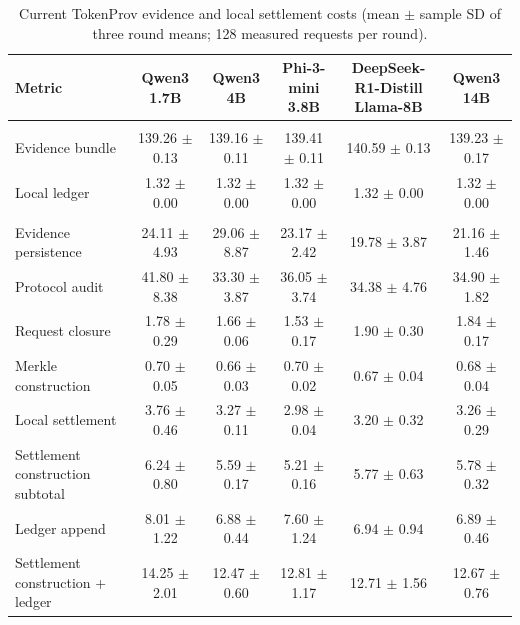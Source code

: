 \begin{table}[!t]
\centering
\caption{Current TokenProv evidence and local settlement costs (mean $\pm$ sample SD of three round means; 128 measured requests per round).}
\label{tab:d-current-evidence-settlement}
\footnotesize
\renewcommand{\arraystretch}{1.10}
\begin{tabular*}{\textwidth}{@{\hspace{4pt}}l@{\extracolsep{\fill}}ccccc@{\hspace{4pt}}}
\toprule
\textbf{Metric} & \shortstack{\textbf{Qwen3}\\\textbf{1.7B}} & \shortstack{\textbf{Qwen3}\\\textbf{4B}} & \shortstack{\textbf{Phi-3-mini}\\\textbf{3.8B}} & \shortstack{\textbf{DeepSeek-R1-Distill}\\\textbf{Llama-8B}} & \shortstack{\textbf{Qwen3}\\\textbf{14B}} \\
\midrule
\rowcolor{gray!12}
\multicolumn{6}{l}{\textbf{Serialized storage (KiB/request)}} \\
Evidence bundle & 139.26 $\pm$ 0.13 & 139.16 $\pm$ 0.11 & 139.41 $\pm$ 0.11 & 140.59 $\pm$ 0.13 & 139.23 $\pm$ 0.17 \\
Local ledger & 1.32 $\pm$ 0.00 & 1.32 $\pm$ 0.00 & 1.32 $\pm$ 0.00 & 1.32 $\pm$ 0.00 & 1.32 $\pm$ 0.00 \\
\midrule
\rowcolor{gray!12}
\multicolumn{6}{l}{\textbf{Processing time (ms/request)}} \\
Evidence persistence & 24.11 $\pm$ 4.93 & 29.06 $\pm$ 8.87 & 23.17 $\pm$ 2.42 & 19.78 $\pm$ 3.87 & 21.16 $\pm$ 1.46 \\
Protocol audit & 41.80 $\pm$ 8.38 & 33.30 $\pm$ 3.87 & 36.05 $\pm$ 3.74 & 34.38 $\pm$ 4.76 & 34.90 $\pm$ 1.82 \\
Request closure & 1.78 $\pm$ 0.29 & 1.66 $\pm$ 0.06 & 1.53 $\pm$ 0.17 & 1.90 $\pm$ 0.30 & 1.84 $\pm$ 0.17 \\
Merkle construction & 0.70 $\pm$ 0.05 & 0.66 $\pm$ 0.03 & 0.70 $\pm$ 0.02 & 0.67 $\pm$ 0.04 & 0.68 $\pm$ 0.04 \\
Local settlement & 3.76 $\pm$ 0.46 & 3.27 $\pm$ 0.11 & 2.98 $\pm$ 0.04 & 3.20 $\pm$ 0.32 & 3.26 $\pm$ 0.29 \\
Settlement construction subtotal & 6.24 $\pm$ 0.80 & 5.59 $\pm$ 0.17 & 5.21 $\pm$ 0.16 & 5.77 $\pm$ 0.63 & 5.78 $\pm$ 0.32 \\
Ledger append & 8.01 $\pm$ 1.22 & 6.88 $\pm$ 0.44 & 7.60 $\pm$ 1.24 & 6.94 $\pm$ 0.94 & 6.89 $\pm$ 0.46 \\
Settlement construction + ledger & 14.25 $\pm$ 2.01 & 12.47 $\pm$ 0.60 & 12.81 $\pm$ 1.17 & 12.71 $\pm$ 1.56 & 12.67 $\pm$ 0.76 \\
\bottomrule
\end{tabular*}
\end{table}
